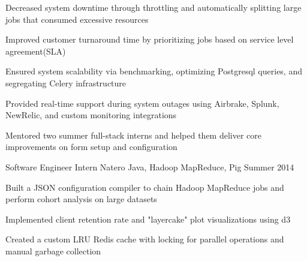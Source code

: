 \begin{cventries}
{\begin{cvitems}
        \item {Decreased system downtime through throttling and automatically splitting large jobs that consumed excessive resources}
        \item {Improved customer turnaround time by prioritizing jobs based on service level agreement(SLA)}
        \item {Ensured system scalability via benchmarking, optimizing Postgresql queries, and segregating Celery infrastructure}
        \item {Provided real-time support during system outages using Airbrake, Splunk, NewRelic, and custom monitoring integrations}
        \item {Mentored two summer full-stack interns and helped them deliver core improvements on form setup and configuration}
      \end{cvitems}
    }
  \cventry
    {Software Engineer Intern}
    {Natero}
    {Java, Hadoop MapReduce, Pig}
    {Summer 2014}
    {
      \begin{cvitems}
        \item {Built a JSON configuration compiler to chain Hadoop MapReduce jobs and perform cohort analysis on large datasets}
        \item {Implemented client retention rate and "layercake" plot visualizations using d3}
        \item {Created a custom LRU Redis cache with locking for parallel operations and manual garbage collection}
      \end{cvitems}
    }
\end{cventries}
